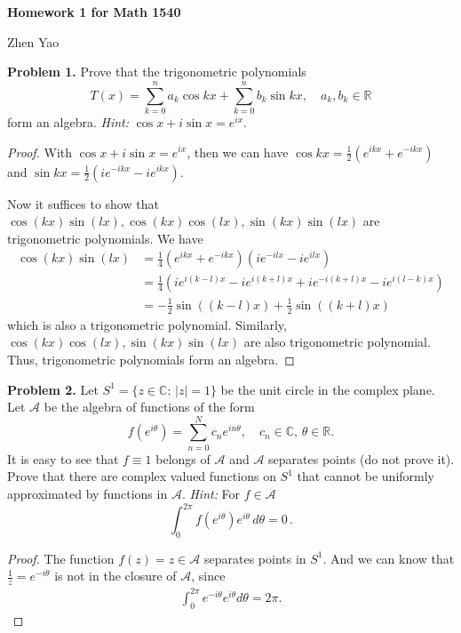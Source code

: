 \documentclass[12pt]{article}
\theoremstyle{definition}
\theoremstyle{definition}
\numberwithin{equation}{subsection}
\begin{document}
\centerline{\bf Homework 1 for Math 1540}
\centerline{Zhen Yao}

\bigskip




\noindent
{\bf Problem 1.}
Prove that the trigonometric polynomials
$$
T(x)=\sum_{k=0}^n a_k\cos kx +\sum_{k=0}^n b_k\sin kx,
\quad
a_k,b_k\in\mathbb{R}
$$
form an algebra. {\em Hint:} $\cos x+ i\sin x= e^{ix}$.
\begin{proof}
With $\cos x+ i\sin x= e^{ix}$, then we can have $\cos kx = \frac{1}{2} \left(e^{ikx} + e^{-ikx}\right)$ and $\sin kx = \frac{1}{2} \left(ie^{-ikx} - ie^{ikx}\right)$. 

Now it suffices to show that $\cos(kx)\sin(lx), \cos(kx)\cos(lx), \sin(kx)\sin(lx)$ are trigonometric polynomials. We have
\begin{align*}
    \cos(kx)\sin(lx) & = \frac{1}{4} \left(e^{ikx} + e^{-ikx}\right) \left(ie^{-ilx} - ie^{ilx}\right) \\
    & = \frac{1}{4} \left(ie^{i(k-l)x} - ie^{i(k+l)x} + ie^{-i(k+l)x} - ie^{i(l-k)x} \right) \\
    & = - \frac{1}{2} \sin((k-l)x) + \frac{1}{2} \sin((k+l)x)
\end{align*}
which is also a trigonometric polynomial. Similarly, $\cos(kx)\cos(lx), \sin(kx)\sin(lx)$ are also trigonometric polynomial. Thus, trigonometric polynomials form an algebra.
\end{proof}

\medskip

\noindent
{\bf Problem 2.}
Let $S^1=\{ z\in\mathbb{C}:\, |z|=1\}$ be the unit circle in the complex plane.
Let $\mathcal{A}$ be the algebra of functions of the form
$$
f\left(e^{i\theta}\right)=\sum_{n=0}^N c_n e^{in\theta},
\quad
c_n\in\mathbb{C},\, \theta\in\mathbb{R}.
$$
It is easy to see that
$f\equiv 1$ belongs of $\mathcal{A}$ and $\mathcal{A}$ separates points
(do not prove it).
Prove that there are complex valued functions on $S^1$ that cannot be uniformly approximated by functions in $\mathcal{A}$.
{\em Hint:} For $f\in \mathcal{A}$
$$
\int_0^{2\pi} f\left(e^{i\theta}\right)e^{i\theta}\, d\theta =0\, .
$$
\begin{proof}
The function $f(z) = z\in \mathcal{A}$ separates points in $S^1$. And we can know that $\frac{1}{z} = e^{-i\theta}$ is not in the closure of $\mathcal{A}$, since
\begin{align*}
    \int^{2\pi}_0 e^{-i\theta} e^{i\theta} d\theta = 2\pi.
\end{align*}
\end{proof}
\end{document}
